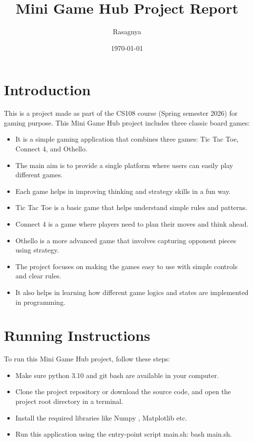 \documentclass{article}
\title{Mini Game Hub Project Report}
\author{Rasagnya}
\date{\today}
\begin{document}
\maketitle
\tableofcontents
\newpage

\section{Introduction}
This is a project made as part of the CS108 course (Spring semester 2026) for gaming purpose.
This Mini Game Hub project includes three classic board games:

\begin{itemize}
    \item It is a simple gaming application that combines three games: Tic Tac Toe, Connect 4, and Othello.
    
    \item The main aim is to provide a single platform where users can easily play different games.
    
    \item Each game helps in improving thinking and strategy skills in a fun way.
    
    \item Tic Tac Toe is a basic game that helps understand simple rules and patterns.
    
    \item Connect 4 is a game where players need to plan their moves and think ahead.
    
    \item Othello is a more advanced game that involves capturing opponent pieces using strategy.
    
    \item The project focuses on making the games easy to use with simple controls and clear rules.
    
    \item It also helps in learning how different game logics and states are implemented in programming.
\end{itemize}
\section{Running Instructions}
To run this Mini Game Hub project, follow these steps:
\begin{itemize}
    \item Make sure python 3.10 and git bash are available in your computer.
    \item  Clone the project repository or download the source code, and open the project root directory in a terminal.
    \item Install the required libraries like Numpy , Matplotlib etc.
    \item Run this application using the entry-point script main.sh:
    bash main.sh.
\end{itemize}
\end{document}
